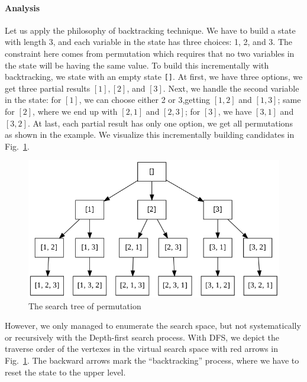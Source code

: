 \documentclass[../main.tex]{subfiles}
\begin{document}
\paragraph{Analysis} Let us apply the philosophy of backtracking technique. We have to build a state with length $3$, and each variable in the state has three choices: 1, 2, and 3. The constraint here comes from permutation which requires that no two variables in the state will be having the same value. To build this incrementally with backtracking, we state with an empty state \texttt{[]}. At first, we have three options, we get three partial results $[1], [2]$, and $[3]$. Next, we handle the second variable in the state: for $[1]$, we can choose either 2 or 3,getting $[1,2]$ and $[1,3]$; same for $[2]$, where we end up with $[2,1]$ and $[2,3]$; for $[3]$, we have $[3,1]$ and $[3,2]$. At last, each partial result has only one option, we  get all permutations as shown in the example. We visualize this incrementally building candidates in Fig.~\ref{fig:backtrack_permutation}. 
\begin{figure}[h]
    \centering
    \includegraphics[width= 0.8\columnwidth]{fig/permutation.png}
    \caption{The search tree of permutation}
    \label{fig:backtrack_permutation}
\end{figure}

However, we only managed to enumerate the search space, but not systematically or recursively with the Depth-first search process. With DFS, we depict the traverse order of the vertexes in the virtual search space with red arrows in Fig.~\ref{fig:backtrack_permutation}. The backward arrows mark the ``backtracking'' process, where we have to reset the state to the upper level. 
\end{document}
